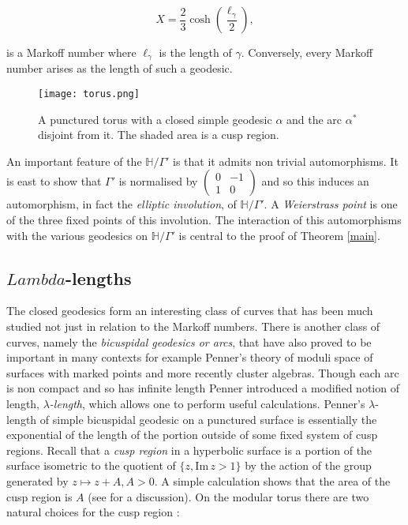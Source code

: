 \documentclass[12pt,a4paper]{amsart}
\def\HH{\mathbb{H}}
\def\im{\mathrm{Im}\,}
\def\xx{\HH/\Gamma'}
\begin{document}
\begin{equation} X  = \frac{2}{3} \cosh \left(
\frac{\ell_\gamma}{2}\right),
\end{equation} 

is a Markoff number where
$\ell_\gamma$ is the length of $\gamma$. Conversely, every Markoff number
arises as the length of such a geodesic.

\begin{figure}[ht]
\begin{center}
\texttt{[image: torus.png]} 
\end{center}
\caption{A punctured torus with a closed simple geodesic $\alpha$ and the arc $\alpha^*$ disjoint from it. The shaded area is a cusp region.}
	\label{fig:torus}
\end{figure}

An important feature of the $\xx$ is that it admits non trivial automorphisms.
It is east to show that $\Gamma'$ is normalised by $\begin{pmatrix} 0 & -1 \\ 1 & 0
\end{pmatrix}$ and so this induces an automorphism, in fact the
\textit{elliptic involution}, of $\xx$. A  \textit{Weierstrass point} is one of
the three fixed points of this involution. The interaction of this
automorphisms with the various geodesics on $\xx$ is central to the proof of
Theorem \ref{main}.

\subsection{$Lambda$-lengths}


The closed geodesics form an interesting class of curves that has been much
studied not just in relation to the Markoff numbers. There is another class of
curves, namely the \textit{bicuspidal geodesics or arcs}, that have also proved
to be important in many contexts for example Penner's theory of moduli space of
surfaces with marked points and more recently cluster algebras. Though each arc
is non compact and so has infinite length Penner \cite{bob} introduced a
modified notion of length, \textit{$\lambda$-length}, which allows one to
perform useful calculations.  Penner's $\lambda$-length of simple bicuspidal
geodesic on a punctured surface is essentially the exponential of  the length
of the portion outside of some fixed system of cusp regions. Recall that a
\textit{cusp region} in a hyperbolic surface is a portion of the surface
isometric to  the quotient of $\{ z, \im z > 1\}$ by the action of the group
generated by $z \mapsto z + A, A > 0$. A simple calculation shows that the area
of the cusp region is $A$ (see \cite{thesis} for a discussion). On the modular
torus there are two natural choices for the cusp region :
\end{document}
